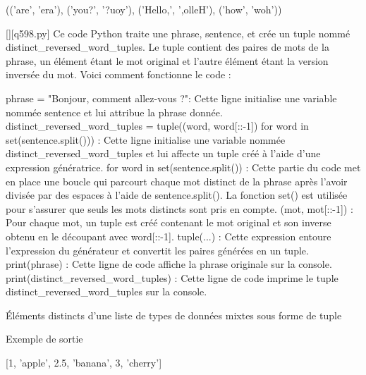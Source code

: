 (('are', 'era'), ('you?', '?uoy'), ('Hello,', ',olleH'), ('how', 'woh'))
        \par
        \begin{solution}
            \renewcommand{\nomfichier}{q598.py}
            \pythonfile{\chemincode \nomfichier}[][\nomfichier]
            Ce code Python traite une phrase, sentence, et crée un tuple nommé distinct\_reversed\_word\_tuples. Le tuple contient des paires de mots de la phrase, un élément étant le mot original et l'autre élément étant la version inversée du mot. Voici comment fonctionne le code :

    phrase = "Bonjour, comment allez-vous ?": Cette ligne initialise une variable nommée sentence et lui attribue la phrase donnée.
    distinct\_reversed\_word\_tuples = tuple((word, word[::-1]) for word in set(sentence.split())) : Cette ligne initialise une variable nommée distinct\_reversed\_word\_tuples et lui affecte un tuple créé à l'aide d'une expression génératrice.
        for word in set(sentence.split()) : Cette partie du code met en place une boucle qui parcourt chaque mot distinct de la phrase après l'avoir divisée par des espaces à l'aide de sentence.split(). La fonction set() est utilisée pour s'assurer que seuls les mots distincts sont pris en compte.
        (mot, mot[::-1]) : Pour chaque mot, un tuple est créé contenant le mot original et son inverse obtenu en le découpant avec word[::-1].
        tuple(...) : Cette expression entoure l'expression du générateur et convertit les paires générées en un tuple.
    print(phrase) : Cette ligne de code affiche la phrase originale sur la console.
    print(distinct\_reversed\_word\_tuples) : Cette ligne de code imprime le tuple distinct\_reversed\_word\_tuples sur la console.
        \end{solution}
        

        \question
        Éléments distincts d'une liste de types de données mixtes sous forme de tuple

Exemple de sortie

[1, 'apple', 2.5, 'banana', 3, 'cherry']

